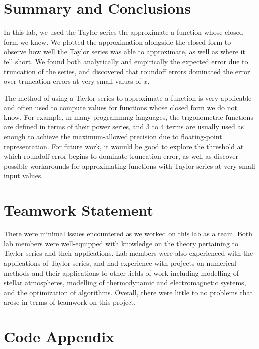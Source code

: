\documentclass[11pt]{article}
\begin{document}
\section{Summary and Conclusions}

In this lab, we used the Taylor series the approximate a function whose closed-form we knew. We plotted the approximation alongside the closed form to observe how well the Taylor series was able to approximate, as well as where it fell short. We found both analytically and empirically the expected error due to truncation of the series, and discovered that roundoff errors dominated the error over truncation errors at very small values of $x$.

The method of using a Taylor series to approximate a function is very applicable and often used to compute values for functions whose closed form we do not know. For example, in many programming languages, the trigonometric functions are defined in terms of their power series, and 3 to 4 terms are usually used as enough to achieve the maximum-allowed precision due to floating-point representation. For future work, it wouuld be good to explore the threshold at which roundoff error begins to dominate truncation error, as well as discover possible workarounds for approximating functions with Taylor series at very small input values.

\section*{Teamwork Statement}
There were minimal issues encountered as we worked on this lab as a team.
Both lab members were well-equipped with knowledge on the theory pertaining to Taylor series and their applications.
Lab members were also experienced with the applications of Taylor series, and had experience with projects on numerical methods and their applications to other fields of work including modelling of stellar atmospheres, modelling of thermodynamic and electromagnetic systems, and the optimization of algorithms.
Overall, there were little to no problems that arose in terms of teamwork on this project.

\clearpage
\section*{Code Appendix}




\end{document}
